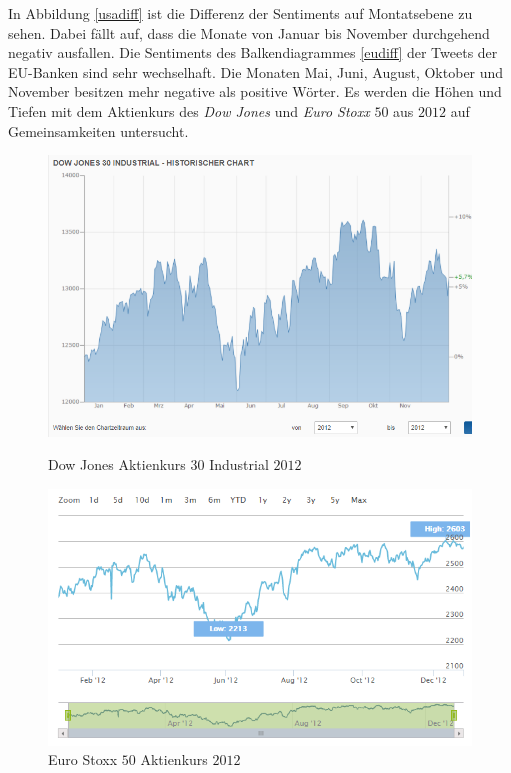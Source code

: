 In Abbildung \ref{usadiff} ist die Differenz der Sentiments auf Montatsebene zu sehen. Dabei fällt auf, dass die Monate von Januar bis November durchgehend negativ ausfallen. Die Sentiments des Balkendiagrammes \ref{eudiff} der Tweets der EU-Banken sind sehr wechselhaft. Die Monaten Mai, Juni, August, Oktober und November besitzen mehr negative als positive Wörter. Es werden die Höhen und Tiefen mit dem Aktienkurs des \textit{Dow Jones} und \textit{Euro Stoxx} $50$ aus $2012$ auf Gemeinsamkeiten untersucht. 
 \begin{figure}[H]
 \begin{minipage}[b]{.4\linewidth} %
 	\includegraphics[width=1\textwidth]{Pictures/DowJones2012.png}
 	\caption{Dow Jones Aktienkurs 30 Industrial $2012$ \cite{Dow}}\label{dowjones}
 \end{minipage}
 \hspace{.2\linewidth}%
 \begin{minipage}[b]{.4\linewidth} %
 	\includegraphics[width=1\textwidth]{Pictures/EuroxStoxx.png}
 	\caption{Euro Stoxx $50$ Aktienkurs $2012$ \cite{stoxx}} \label{eustoxx}
 \end{minipage}
\end{figure}
